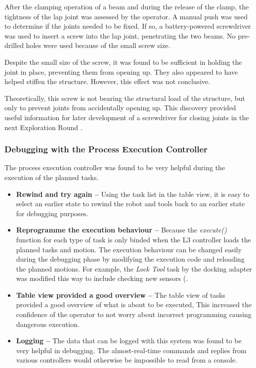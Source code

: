 After the clamping operation of a beam and during the release of the clamp, the tightness of the lap joint was assessed by the operator. A manual push was used to determine if the joints needed to be fixed. If so, a battery-powered screwdriver was used to insert a screw into the lap joint, penetrating the two beams. No pre-drilled holes were used because of the small screw size.

Despite the small size of the screw, it was found to be sufficient in holding the joint in place, preventing them from opening up. They also appeared to have helped stiffen the structure. However, this effect was not conclusive.

Theoretically, this screw is not bearing the structural load of the structure, but only to prevent joints from accidentally opening up. This discovery provided useful information for later development of a screwdriver for closing joints in the next Exploration Round .

\subsubsection{Debugging with the Process Execution Controller}
\label{subsubsection:exploration-3-debugging-with-the-process-execution-controller}

The process execution controller  was found to be very helpful during the execution of the planned tasks.

\begin{itemize}
	\item \textbf{Rewind and try again --} Using the task list in the table view, it is easy to select an earlier state to rewind the robot and tools back to an earlier state for debugging purposes.

	\item \textbf{Reprogramme the execution behaviour --} Because the \textit{execute() }function for each type of task is only binded when the L3 controller loads the planned tasks and motion. The execution behaviour can be changed easily during the debugging phase by modifying the execution code and reloading the planned motions. For example, the \textit{Lock Tool }task by the docking adapter was modified this way to include checking new sensors (.

	\item \textbf{Table view provided a good overview --} The table view of tasks provided a good overview of what is about to be executed, This increased the confidence of the operator to not worry about incorrect programming causing dangerous execution.

	\item \textbf{Logging --} The data that can be logged with this system was found to be very helpful in debugging. The almost-real-time commands and replies from various controllers would otherwise be impossible to read from a console.

\end{itemize}
